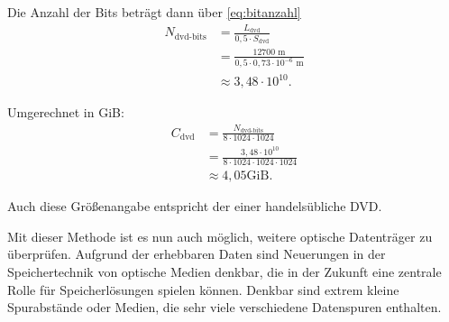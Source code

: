 \documentclass[9pt,twocolumn,twoside]{pnas-new}
\begin{document}
Die Anzahl der Bits beträgt dann über \eqref{eq:bitanzahl}
\begin{align*}
N_{\mbox{dvd-bits}} &=  \frac{L_{\mbox{dvd}}}{0,5\cdot S_{\mbox{dvd}}}\\
&= \frac{12700\mbox{ m}}{0,5\cdot 0,73\cdot10^{-6}\mbox{ m}}\\
&\approx 3,48\cdot 10^{10}.
\end{align*}

Umgerechnet in GiB:
\begin{align*}
C_{\mbox{dvd}} &= \frac{N_{\mbox{dvd-bits}}}{8\cdot1024\cdot1024}\\
&= \frac{3,48\cdot10^{10}}{8\cdot1024\cdot1024\cdot1024}\\
&\approx 4,05\mbox{GiB}.
\end{align*}

Auch diese Größenangabe entspricht der einer handelsübliche DVD.


Mit dieser Methode ist es nun auch möglich, weitere optische Datenträger zu überprüfen.
Aufgrund der erhebbaren Daten sind Neuerungen in der Speichertechnik von optische Medien denkbar, die in der Zukunft eine zentrale Rolle für Speicherlösungen spielen können.
Denkbar sind extrem kleine Spurabstände oder Medien, die sehr viele verschiedene Datenspuren enthalten.





\end{document}
